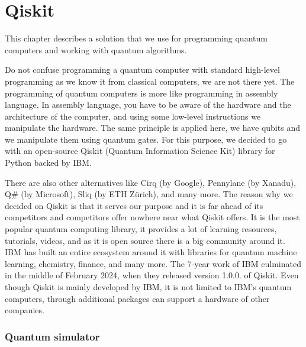 \chapter{Qiskit}\label{ch:qiskit}
This chapter describes a solution that we use for programming quantum computers and working with quantum algorithms. 

Do not confuse programming a quantum computer with standard high-level programming as we know it from classical computers, we are not there yet. The programming of quantum computers is more like programming in assembly language. In assembly language, you have to be aware of the hardware and the architecture of the computer, and using some low-level instructions we manipulate the hardware. The same principle is applied here, we have qubits and we manipulate them using quantum gates. For this purpose, we decided to go with an open-source Qiskit (Quantum Information Science Kit) library for Python backed by IBM.

There are also other alternatives like Cirq (by Google), Pennylane (by Xanadu), Q\# (by Microsoft), Sliq (by ETH Zürich), and many more.  The reason why we decided on Qiskit is that it serves our purpose and it is far ahead of its competitors and competitors offer nowhere near what Qiskit offers. It is the most popular quantum computing library, it provides a lot of learning resources, tutorials, videos, and as it is open source there is a big community around it. IBM has built an entire ecosystem around it \cite{qiskit_ecosystem} with libraries for quantum machine learning, chemistry, finance, and many more. The 7-year work of IBM culminated in the middle of February 2024, when they released version 1.0.0. of Qiskit. Even though Qiskit is mainly developed by IBM, it is not limited to IBM's quantum computers, through additional packages can support a hardware of other companies.

\subsection{Quantum simulator}

